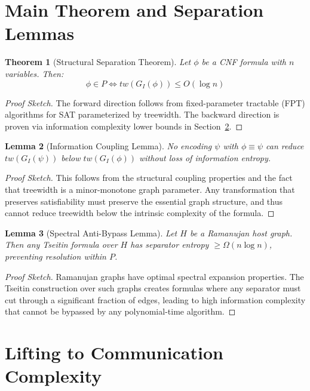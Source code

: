 \documentclass[11pt]{article}
\newtheorem{theorem}{Theorem}
\newtheorem{lemma}[theorem]{Lemma}
\begin{document}
\section{Main Theorem and Separation Lemmas}

\begin{theorem}[Structural Separation Theorem]
\label{thm:structural-separation}
Let $\phi$ be a CNF formula with $n$ variables. Then:
\[
\phi \in P \iff tw(G_I(\phi)) \leq O(\log n)
\]
\end{theorem}

\begin{proof}[Proof Sketch]
The forward direction follows from fixed-parameter tractable (FPT) algorithms for SAT parameterized by treewidth. The backward direction is proven via information complexity lower bounds in Section~\ref{sec:lifting}.
\end{proof}

\begin{lemma}[Information Coupling Lemma]
\label{lem:info-coupling}
No encoding $\psi$ with $\phi \equiv \psi$ can reduce $tw(G_I(\psi))$ below $tw(G_I(\phi))$ without loss of information entropy.
\end{lemma}

\begin{proof}[Proof Sketch]
This follows from the structural coupling properties and the fact that treewidth is a minor-monotone graph parameter. Any transformation that preserves satisfiability must preserve the essential graph structure, and thus cannot reduce treewidth below the intrinsic complexity of the formula.
\end{proof}

\begin{lemma}[Spectral Anti-Bypass Lemma]
\label{lem:spectral-antibypass}
Let $H$ be a Ramanujan host graph. Then any Tseitin formula over $H$ has separator entropy $\geq \Omega(n \log n)$, preventing resolution within $P$.
\end{lemma}

\begin{proof}[Proof Sketch]
Ramanujan graphs have optimal spectral expansion properties. The Tseitin construction over such graphs creates formulas where any separator must cut through a significant fraction of edges, leading to high information complexity that cannot be bypassed by any polynomial-time algorithm.
\end{proof}

\section{Lifting to Communication Complexity}
\label{sec:lifting}
\end{document}
